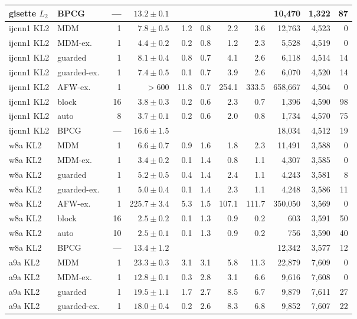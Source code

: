 \begin{table}[htbp]
\begin{tabular}{llrrrrrrrrr}
gisette $L_2$ & BPCG & --- & $13.2\pm0.1$ &  & & & & 10,470 & 1,322 & 87 \\
\midrule
ijcnn1 KL2 & MDM & 1 & $7.8\pm0.5$ & 1.2 & 0.8 & 2.2 & 3.6 & 12,763 & 4,523 & 0 \\
ijcnn1 KL2 & MDM-ex.\ & 1 & $4.4\pm0.2$ & 0.2 & 0.8 & 1.2 & 2.3 & 5,528 & 4,519 & 0 \\
ijcnn1 KL2 & guarded & 1 & $8.1\pm0.4$ & 0.8 & 0.7 & 4.1 & 2.6 & 6,118 & 4,514 & 14 \\
ijcnn1 KL2 & guarded-ex.\ & 1 & $7.4\pm0.5$ & 0.1 & 0.7 & 3.9 & 2.6 & 6,070 & 4,520 & 14 \\
ijcnn1 KL2 & AFW-ex.\ & 1 & $>600$ & 11.8 & 0.7 & 254.1 & 333.5 & 658,667 & 4,504 & 0 \\
ijcnn1 KL2 & block & 16 & $3.8\pm0.3$ & 0.2 & 0.6 & 2.3 & 0.7 & 1,396 & 4,590 & 98 \\
ijcnn1 KL2 & auto & 8 & $3.7\pm0.1$ & 0.2 & 0.6 & 2.0 & 0.8 & 1,734 & 4,570 & 75 \\
ijcnn1 KL2 & BPCG & --- & $16.6\pm1.5$ &  & & & & 18,034 & 4,512 & 19 \\
\midrule
w8a KL2 & MDM & 1 & $6.6\pm0.7$ & 0.9 & 1.6 & 1.8 & 2.3 & 11,491 & 3,588 & 0 \\
w8a KL2 & MDM-ex.\ & 1 & $3.4\pm0.2$ & 0.1 & 1.4 & 0.8 & 1.1 & 4,307 & 3,585 & 0 \\
w8a KL2 & guarded & 1 & $5.2\pm0.5$ & 0.4 & 1.4 & 2.4 & 1.1 & 4,243 & 3,581 & 8 \\
w8a KL2 & guarded-ex.\ & 1 & $5.0\pm0.4$ & 0.1 & 1.4 & 2.3 & 1.1 & 4,248 & 3,586 & 11 \\
w8a KL2 & AFW-ex.\ & 1 & $225.7\pm3.4$ & 5.3 & 1.5 & 107.1 & 111.7 & 350,050 & 3,569 & 0 \\
w8a KL2 & block & 16 & $2.5\pm0.2$ & 0.1 & 1.3 & 0.9 & 0.2 & 603 & 3,591 & 50 \\
w8a KL2 & auto & 10 & $2.5\pm0.1$ & 0.1 & 1.3 & 0.9 & 0.2 & 756 & 3,590 & 40 \\
w8a KL2 & BPCG & --- & $13.4\pm1.2$ &  & & & & 12,342 & 3,577 & 12 \\
\midrule
a9a KL2 & MDM & 1 & $23.3\pm0.3$ & 3.1 & 3.1 & 5.8 & 11.3 & 22,879 & 7,609 & 0 \\
a9a KL2 & MDM-ex.\ & 1 & $12.8\pm0.1$ & 0.3 & 2.8 & 3.1 & 6.6 & 9,616 & 7,608 & 0 \\
a9a KL2 & guarded & 1 & $19.5\pm1.1$ & 1.7 & 2.7 & 8.5 & 6.7 & 9,879 & 7,611 & 27 \\
a9a KL2 & guarded-ex.\ & 1 & $18.0\pm0.4$ & 0.2 & 2.6 & 8.3 & 6.8 & 9,852 & 7,607 & 22 \\

\end{tabular}
\end{table}
